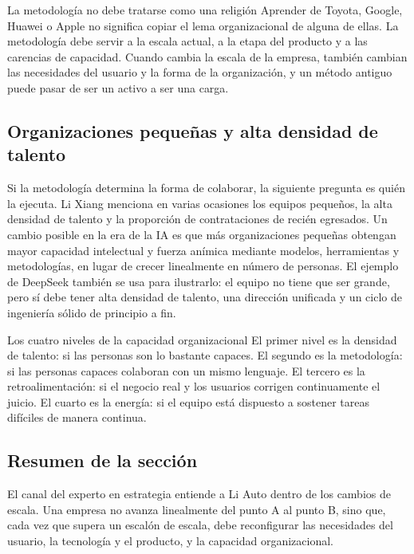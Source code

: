 \begin{warningbox}{La metodología no debe tratarse como una religión}
Aprender de Toyota, Google, Huawei o Apple no significa copiar el lema organizacional de alguna de ellas. La metodología debe servir a la escala actual, a la etapa del producto y a las carencias de capacidad. Cuando cambia la escala de la empresa, también cambian las necesidades del usuario y la forma de la organización, y un método antiguo puede pasar de ser un activo a ser una carga.
\end{warningbox}

\subsection{Organizaciones pequeñas y alta densidad de talento}

Si la metodología determina la forma de colaborar, la siguiente pregunta es quién la ejecuta. Li Xiang menciona en varias ocasiones los equipos pequeños, la alta densidad de talento y la proporción de contrataciones de recién egresados. Un cambio posible en la era de la IA es que más organizaciones pequeñas obtengan mayor capacidad intelectual y fuerza anímica mediante modelos, herramientas y metodologías, en lugar de crecer linealmente en número de personas. El ejemplo de DeepSeek también se usa para ilustrarlo: el equipo no tiene que ser grande, pero sí debe tener alta densidad de talento, una dirección unificada y un ciclo de ingeniería sólido de principio a fin.

\begin{importantbox}{Los cuatro niveles de la capacidad organizacional}
El primer nivel es la densidad de talento: si las personas son lo bastante capaces. El segundo es la metodología: si las personas capaces colaboran con un mismo lenguaje. El tercero es la retroalimentación: si el negocio real y los usuarios corrigen continuamente el juicio. El cuarto es la energía: si el equipo está dispuesto a sostener tareas difíciles de manera continua.
\end{importantbox}

\subsection{Resumen de la sección}

El canal del experto en estrategia entiende a Li Auto dentro de los cambios de escala. Una empresa no avanza linealmente del punto A al punto B, sino que, cada vez que supera un escalón de escala, debe reconfigurar las necesidades del usuario, la tecnología y el producto, y la capacidad organizacional.
